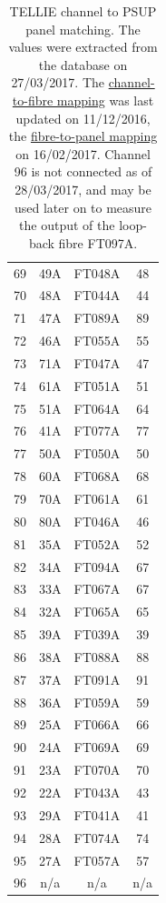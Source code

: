 \documentclass[12pt]{report}
\begin{document}
\begin{table}
\begin{center}
\begin{tabular}{|c|c|c|c|}
			69 & 49A & FT048A & 48 \\
			70 & 48A & FT044A & 44 \\
			71 & 47A & FT089A & 89 \\
			72 & 46A & FT055A & 55 \\
			73 & 71A & FT047A & 47 \\
			74 & 61A & FT051A & 51 \\
			75 & 51A & FT064A & 64 \\
			76 & 41A & FT077A & 77 \\
			77 & 50A & FT050A & 50 \\
			78 & 60A & FT068A & 68 \\
			79 & 70A & FT061A & 61 \\
			80 & 80A & FT046A & 46 \\
			81 & 35A & FT052A & 52 \\
			82 & 34A & FT094A & 67 \\
			83 & 33A & FT067A & 67 \\
			84 & 32A & FT065A & 65 \\
			85 & 39A & FT039A & 39 \\
			86 & 38A & FT088A & 88 \\
			87 & 37A & FT091A & 91 \\
			88 & 36A & FT059A & 59 \\
			89 & 25A & FT066A & 66 \\
			90 & 24A & FT069A & 69 \\
			91 & 23A & FT070A & 70 \\
			92 & 22A & FT043A & 43 \\
			93 & 29A & FT041A & 41 \\
			94 & 28A & FT074A & 74 \\
			95 & 27A & FT057A & 57 \\
			96 & n/a & n/a & n/a \\
			\hline
		\end{tabular}
	\end{center}
	\caption{TELLIE channel to PSUP panel matching. The values were extracted from the database on 27/03/2017. The \href{http://couch.snopl.us/_utils/document.html?telliedb/bf55eb1d60fc6d997a4743eddbf37978}{channel-to-fibre mapping} was last updated on 11/12/2016, the \href{http://couch.snopl.us/_utils/document.html?telliedb/b7d1d36553889147908a41f2d47c753d}{fibre-to-panel mapping} on 16/02/2017. Channel 96 is not connected as of 28/03/2017, and may be used later on to measure the output of the loop-back fibre FT097A.}
	\label{tab:channel_mapping}
\end{table}
\end{document}
